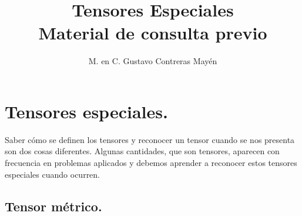 \documentclass[hidelinks,12pt]{article}
\title{Tensores Especiales\\ \large{Material de consulta previo}\vspace{-3ex}}
\author{M. en C. Gustavo Contreras Mayén}
\date{ }
\begin{document}
\vspace{-4cm}
\maketitle
\fontsize{14}{14}\selectfont
\tableofcontents
\newpage

\section{Tensores especiales.}

Saber cómo se definen los tensores y reconocer un tensor cuando se nos presenta son dos cosas diferentes. Algunas cantidades, que son tensores, aparecen con frecuencia en problemas aplicados y debemos aprender a reconocer estos tensores especiales cuando ocurren.

\subsection{Tensor métrico.}
\end{document}

